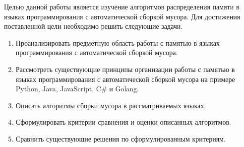 Целью данной работы является изучение алгоритмов распределения памяти в языках программирования с автоматической сборкой мусора. Для достижения поставленной цели необходимо решить следующие задачи.

\begin{enumerate}[label*=\arabic*.]
	\item Проанализировать предметную область работы с памятью в языках программирования с автоматической сборкой мусора.
	\item Рассмотреть существующие принципы организации работы с памятью в языках программирования с автоматической сборкой мусора на примере Python, Java, JavaScript, C\# и Golang.
	\item Описать алгоритмы сборки мусора в рассматриваемых языках.
	\item Сформулировать критерии сравнения и оценки описанных алгоритмов.
	\item Сравнить существующие решения по сформулированным критериям. 
\end{enumerate}